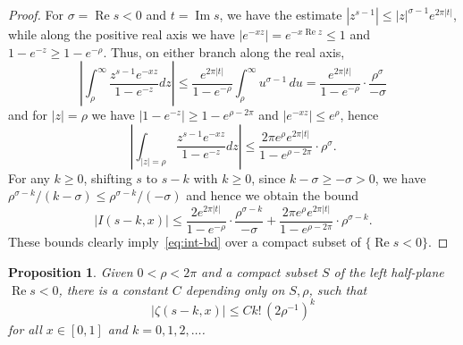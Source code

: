 \documentclass[11pt,a4paper,reqno]{amsart}
\renewcommand{\Re}{\operatorname{Re}}
\renewcommand{\Im}{\operatorname{Im}}
\theoremstyle{plain}
\newtheorem{prop}[theorem]{Proposition}
\theoremstyle{remark}
\numberwithin{equation}{section}
\begin{document}
\begin{proof}
For $\sigma = \Re s < 0$ and $t = \Im s$, we have the estimate $|z^{s-1}| \leq |z|^{\sigma - 1} e^{2 \pi |t|}$, while along the positive real axis we have $|e^{-xz}| = e^{-x \Re z} \leq 1$ and $1 - e^{-z} \geq 1 - e^{-\rho}$. Thus, on either branch along the real axis,
\[
	\left| 
		\int_{\rho}^{\infty} \frac{z^{s-1} e^{-xz}}{1 - e^{-z}} dz
	\right|
	\leq
	  \frac{e^{2\pi |t|}}{1 - e^{-\rho}} \int_{\rho}^{\infty} u^{\sigma - 1} \, du
	= \frac{e^{2\pi |t|}}{1 - e^{-\rho}} \cdot \frac{\rho^{\sigma}}{-\sigma}
\]
and for $|z| = \rho$ we have $|1 - e^{-z}| \geq 1 - e^{\rho - 2\pi}$ and $|e^{-xz}| \leq e^{\rho}$, hence
\[
	\left| 
		\int_{|z|=\rho} \frac{z^{s-1} e^{-xz}}{1 - e^{-z}} dz
	\right|
	\leq	 \frac{2 \pi e^{\rho}  e^{2\pi |t|}}{1 - e^{\rho - 2\pi}} \cdot \rho^{\sigma}.
\]
For any $k \geq 0$, shifting $s$ to $s - k$ with $k \geq 0$, since $k - \sigma \geq -\sigma > 0$, we have $\rho^{\sigma - k}/(k-\sigma) \leq \rho^{\sigma - k}/(-\sigma)$ and hence we obtain the bound
\[
	     |I(s-k,x)|
	\leq   \frac{2e^{2\pi |t|}}{1 - e^{-\rho}} \cdot \frac{\rho^{\sigma-k}}{-\sigma}
	     + \frac{2 \pi e^{\rho}  e^{2\pi |t|}}{1 - e^{\rho - 2\pi}} \cdot \rho^{\sigma-k}.
\]
These bounds clearly imply~\eqref{eq:int-bd} over a compact subset of $\{ \Re s < 0 \}$.
\end{proof}




\begin{prop}
\label{prop:HZ-bd}
Given $0 < \rho < 2\pi$ and a compact subset $S$ of the left half-plane $\Re s < 0$, there is a constant $C$ depending only on $S,\rho$, such that
%
\begin{equation*}
	|\zeta(s-k,x)| \leq C k!\, (2\rho^{-1})^{k}
\end{equation*}
%
for all $x \in [0,1]$ and $k = 0,1,2,\dots$.
\end{prop}
\end{document}
